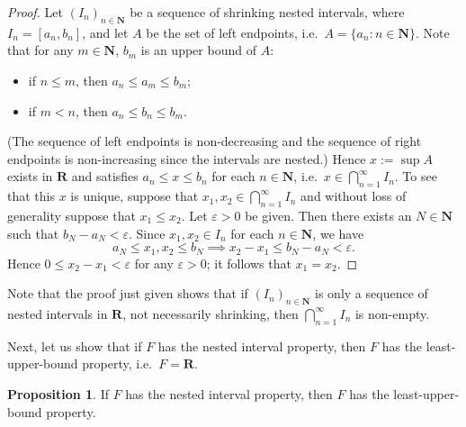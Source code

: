 \documentclass[12pt]{article}
\theoremstyle{definition}
\newtheorem{proposition}[definition]{Proposition}
\newcommand{\N}{\mathbf{N}}
\newcommand{\R}{\mathbf{R}}
\begin{document}
\begin{proof}
    Let \( (I_n)_{n \in \N} \) be a sequence of shrinking nested intervals, where \( I_n = [a_n, b_n] \), and let \( A \) be the set of left endpoints, i.e.\ \( A = \{ a_n : n \in \N \} \). Note that for any \( m \in \N \), \( b_m \) is an upper bound of \( A \):
    \begin{itemize}
        \item if \( n \leq m\), then \( a_n \leq a_m \leq b_m \);
        \item if \( m < n \), then \( a_n \leq b_n \leq b_m \).
    \end{itemize}
    (The sequence of left endpoints is non-decreasing and the sequence of right endpoints is non-increasing since the intervals are nested.) Hence \( x := \sup A \) exists in \( \R \) and satisfies \( a_n \leq x \leq b_n \) for each \( n \in \N \), i.e.\ \( x \in \bigcap_{n=1}^{\infty} I_n \). To see that this \( x \) is unique, suppose that \( x_1, x_2 \in \bigcap_{n=1}^{\infty} I_n \) and without loss of generality suppose that \( x_1 \leq x_2 \). Let \( \varepsilon > 0 \) be given. Then there exists an \( N \in \N \) such that \( b_N - a_N < \varepsilon \). Since \( x_1, x_2 \in I_n \) for each \( n \in \N \), we have
    \[
        a_N \leq x_1, x_2 \leq b_N \implies x_2 - x_1 \leq b_N - a_N < \varepsilon.
    \]
    Hence \( 0 \leq x_2 - x_1 < \varepsilon \) for any \( \varepsilon > 0 \); it follows that \( x_1 = x_2 \).
\end{proof}

Note that the proof just given shows that if \( (I_n)_{n \in \N} \) is only a sequence of nested intervals in \( \R \), not necessarily shrinking, then \( \bigcap_{n=1}^{\infty} I_n \) is non-empty.

Next, let us show that if \( F \) has the nested interval property, then \( F \) has the least-upper-bound property, i.e.\ \( F = \R \).

\begin{proposition}
\label{prop:nip_implies_lub}
    If \( F \) has the nested interval property, then \( F \) has the least-upper-bound property.
\end{proposition}
\end{document}
